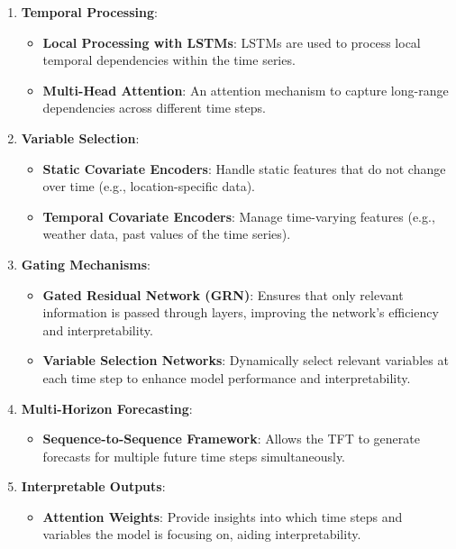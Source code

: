 \documentclass[
]{krantz}
\providecommand{\tightlist}{%
  \setlength{\itemsep}{0pt}\setlength{\parskip}{0pt}}
\begin{document}
\begin{enumerate}
\def\labelenumi{\arabic{enumi}.}
\tightlist
\item
  \textbf{Temporal Processing}:

  \begin{itemize}
  \tightlist
  \item
    \textbf{Local Processing with LSTMs}: LSTMs are used to process local temporal dependencies within the time series.
  \item
    \textbf{Multi-Head Attention}: An attention mechanism to capture long-range dependencies across different time steps.
  \end{itemize}
\item
  \textbf{Variable Selection}:

  \begin{itemize}
  \tightlist
  \item
    \textbf{Static Covariate Encoders}: Handle static features that do not change over time (e.g., location-specific data).
  \item
    \textbf{Temporal Covariate Encoders}: Manage time-varying features (e.g., weather data, past values of the time series).
  \end{itemize}
\item
  \textbf{Gating Mechanisms}:

  \begin{itemize}
  \tightlist
  \item
    \textbf{Gated Residual Network (GRN)}: Ensures that only relevant information is passed through layers, improving the network's efficiency and interpretability.
  \item
    \textbf{Variable Selection Networks}: Dynamically select relevant variables at each time step to enhance model performance and interpretability.
  \end{itemize}
\item
  \textbf{Multi-Horizon Forecasting}:

  \begin{itemize}
  \tightlist
  \item
    \textbf{Sequence-to-Sequence Framework}: Allows the TFT to generate forecasts for multiple future time steps simultaneously.
  \end{itemize}
\item
  \textbf{Interpretable Outputs}:

  \begin{itemize}
  \tightlist
  \item
    \textbf{Attention Weights}: Provide insights into which time steps and variables the model is focusing on, aiding interpretability.
  \end{itemize}
\end{enumerate}
\end{document}

